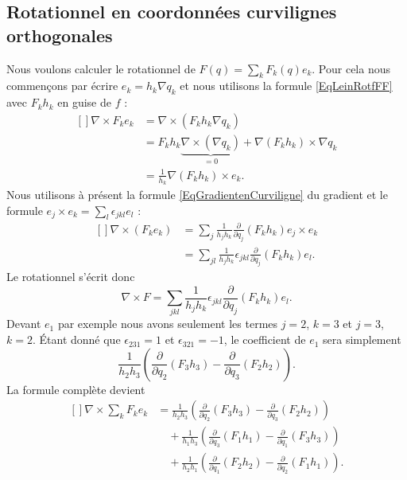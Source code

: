 \subsection{Rotationnel en coordonnées curvilignes orthogonales}

Nous voulons calculer le rotationnel de $F(q)=\sum_kF_k(q)e_k$. Pour cela nous commençons par écrire $e_k=h_k\nabla q_k$ et nous utilisons la formule \eqref{EqLeinRotfFF} avec $F_kh_k$ en guise de $f$ :
\begin{equation}
    \begin{aligned}[]
        \nabla\times F_ke_k&=\nabla\times(F_kh_k\nabla q_k)\\
        &=F_kh_k\underbrace{\nabla\times(\nabla q_k)}_{=0}+\nabla(F_kh_k)\times\nabla q_k\\
        &=\frac{1}{ h_k }\nabla(F_kh_k)\times e_k.
    \end{aligned}
\end{equation}
Nous utilisons à présent la formule \eqref{EqGradientenCurviligne} du gradient et le formule $e_j\times e_k=\sum_l\epsilon_{jkl}e_l$ :
\begin{equation}
    \begin{aligned}[]
        \nabla\times(F_ke_k)&=\sum_{j}\frac{1}{ h_jh_k }\frac{ \partial  }{ \partial q_j }(F_kh_k)e_j\times e_k\\
        &=\sum_{jl}\frac{1}{ h_jh_k }\epsilon_{jkl}\frac{ \partial  }{ \partial q_j }(F_kh_k)e_l.
    \end{aligned}
\end{equation}
Le rotationnel s'écrit donc
\begin{equation}
    \nabla\times F=\sum_{jkl}\frac{1}{ h_jh_k }\epsilon_{jkl}\frac{ \partial  }{ \partial q_j }(F_kh_k)e_l.
\end{equation}
Devant $e_1$ par exemple nous avons seulement les termes $j=2$, $k=3$ et $j=3$, $k=2$. Étant donné que $\epsilon_{231}=1$ et $\epsilon_{321}=-1$, le coefficient de $e_1$ sera simplement
\begin{equation}
    \frac{1}{ h_2h_3 }\left( \frac{ \partial  }{ \partial q_2 }(F_3h_3)-\frac{ \partial  }{ \partial q_3 }(F_2h_2) \right).
\end{equation}
La formule complète devient
\begin{equation}
    \begin{aligned}[]
        \nabla\times\sum_k F_ke_k&=\frac{1}{ h_2h_3 }\left( \frac{ \partial  }{ \partial q_2 }(F_3h_3)-\frac{ \partial  }{ \partial q_3 }(F_2h_2) \right)\\
            &\quad+\frac{1}{ h_1h_3 }\left( \frac{ \partial  }{ \partial q_3 }(F_1h_1)-\frac{ \partial  }{ \partial q_1 }(F_3h_3) \right)\\
            &\quad+\frac{1}{ h_2h_1 }\left( \frac{ \partial  }{ \partial q_1 }(F_2h_2)-\frac{ \partial  }{ \partial q_2 }(F_1h_1) \right).  
    \end{aligned} 
\end{equation} 

